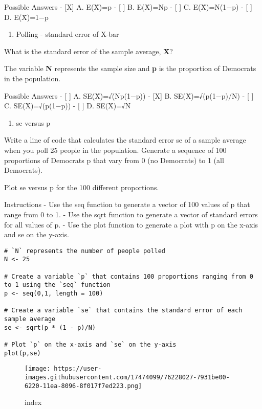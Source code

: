 \documentclass[
]{article}
\providecommand{\tightlist}{%
  \setlength{\itemsep}{0pt}\setlength{\parskip}{0pt}}
\begin{document}
Possible Answers - {[}X{]} A. E(X̄)=p - {[} {]} B. E(X̄)=Np - {[} {]} C.
E(X̄)=N(1−p) - {[} {]} D. E(X̄)=1−p

\begin{enumerate}
\def\labelenumi{\arabic{enumi}.}
\setcounter{enumi}{3}
\tightlist
\item
  Polling - standard error of X-bar
\end{enumerate}

What is the standard error of the sample average, \textbf{X̄}?

The variable \textbf{N} represents the sample size and \textbf{p} is the
proportion of Democrats in the population.

Possible Answers - {[} {]} A. SE(X̄)=√(Np(1−p)) - {[}X{]} B.
SE(X̄)=√(p(1−p)/N) - {[} {]} C. SE(X̄)=√(p(1−p)) - {[} {]} D. SE(X̄)=√N

\begin{enumerate}
\def\labelenumi{\arabic{enumi}.}
\setcounter{enumi}{4}
\tightlist
\item
  se versus p
\end{enumerate}

Write a line of code that calculates the standard error se of a sample
average when you poll 25 people in the population. Generate a sequence
of 100 proportions of Democrats p that vary from 0 (no Democrats) to 1
(all Democrats).

Plot se versus p for the 100 different proportions.

Instructions - Use the seq function to generate a vector of 100 values
of p that range from 0 to 1. - Use the sqrt function to generate a
vector of standard errors for all values of p. - Use the plot function
to generate a plot with p on the x-axis and se on the y-axis.

\begin{verbatim}
# `N` represents the number of people polled
N <- 25

# Create a variable `p` that contains 100 proportions ranging from 0 to 1 using the `seq` function
p <- seq(0,1, length = 100)

# Create a variable `se` that contains the standard error of each sample average
se <- sqrt(p * (1 - p)/N)

# Plot `p` on the x-axis and `se` on the y-axis
plot(p,se)
\end{verbatim}

\begin{figure}
\centering
\texttt{[image: https://user-images.githubusercontent.com/17474099/76228027-7931be00-6220-11ea-8096-8f017f7ed223.png]}
\caption{index}
\end{figure}
\end{document}
